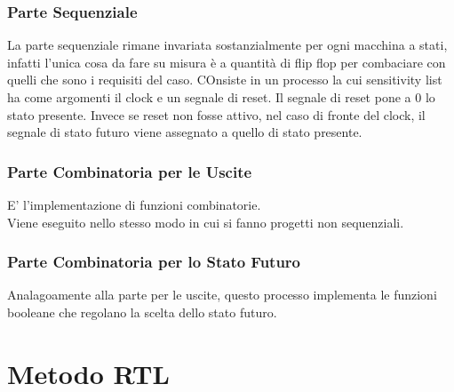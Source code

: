 \documentclass[a4paper]{book}
\begin{document}
\subsubsection*{Parte Sequenziale}
La parte sequenziale rimane invariata sostanzialmente per ogni macchina a stati, infatti l'unica cosa da fare su misura è a quantità di flip flop per combaciare con quelli che sono i requisiti del caso.
COnsiste in un processo la cui sensitivity list ha come argomenti il clock e un segnale di reset.
Il segnale di reset pone a 0 lo stato presente.
Invece se reset non fosse attivo, nel caso di fronte del clock, il segnale di stato futuro viene assegnato a quello di stato presente.

\subsubsection*{Parte Combinatoria per le Uscite}

E' l'implementazione di funzioni combinatorie.\\
Viene eseguito nello stesso modo in cui si fanno progetti non sequenziali.


\subsubsection*{Parte Combinatoria per lo Stato Futuro}

Analagoamente alla parte per le uscite, questo processo implementa le funzioni booleane che regolano la scelta dello stato futuro.



































\section{Metodo RTL}
\end{document}
